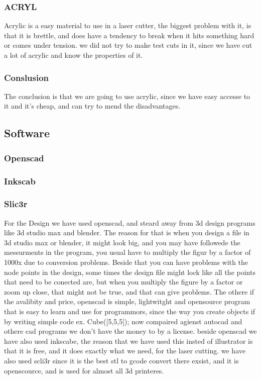 \subsubsection{ACRYL}
Acrylic is a easy material to use in a laser cutter, the biggest problem with it, is that it is brettle, and does have a tendency to break when it hits something hard or comes under tension.
we did not try to make test cuts in it, since we have cut a lot of acrylic and know the properties of it.

\subsubsection{Conslusion}
The conclusion is that we are going to use acrylic, since we have easy accesse to it and it's cheap, and can try to mend the disadvantages.

\subsection{Software}
\subsubsection{Openscad}
\subsubsection{Inkscab}
\subsubsection{Slic3r}
For the Design we have used openscad, and steard away from 3d design programs like 3d studio max and blender.
The reason for that is when you design a file in 3d studio max or blender, it might look big, and you may have followede the messurments in the program, you usual have to multiply the figur by a factor of 1000x due to conversion problems. Beside that you can have problems with the node points in the design, some times the design file might lock like all the points that need to be conected are, but when you multiply the figure by a factor or zoom up close, that might not be true, and that can give problems.
The othere if the avalibity and price, openscad is simple, lightwitght and opensource program that is easy to learn and use for programmors, since the way you create objects if by writing simple code ex. Cube([5,5,5]); now compaired agienst autocad and othere cad programs we don't have the money to by a license.
beside openscad we have also used inkscabe, the reason that we have used this insted of illustrator is that it is free, and it does exactly what we need, for the laser cutting.
we have also used scli3r since it is the best stl to gcode convert there exsist, and it is openscource, and is used for almost all 3d printeres.

